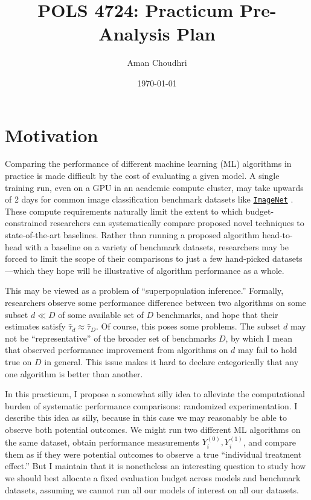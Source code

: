 \documentclass[11pt, oneside]{article}
\title{POLS 4724: Practicum Pre-Analysis Plan}
\author{Aman Choudhri}
\date{\today}
\newcommand{\dataset}[2]{
    \href{#2}{\texttt{#1}}
}
\newcommand{\ImageNet}{\dataset{ImageNet}{https://www.image-net.org/about.php}}
\begin{document}
\maketitle

\section*{Motivation}

Comparing the performance of different machine learning (ML) algorithms in practice
is made difficult by the cost of evaluating a given model. A single training
run, even on a GPU in an academic compute cluster, may take upwards of 2 days
for common image classification benchmark datasets like \ImageNet. These compute
requirements naturally limit the extent to which budget-constrained researchers
can systematically compare proposed novel techniques to state-of-the-art
baselines. Rather than running a proposed algorithm head-to-head with a
baseline on a variety of benchmark datasets, researchers may be forced to limit
the scope of their comparisons to just a few hand-picked datasets—which they
hope will be illustrative of algorithm performance as a whole.

This may be viewed as a problem of ``superpopulation inference.'' Formally,
researchers observe some performance difference between two algorithms on some
subset $d \ll D$ of some available set of $D$ benchmarks, and hope that their
estimates satisfy $\hat{\tau}_d \approx \hat{\tau}_D$. Of course, this poses some problems.
The subset $d$ may not be ``representative'' of the broader set of benchmarks $D$, by which
I mean that observed performance improvement from algorithms on $d$ may fail to hold
true on $D$ in general. This issue makes it hard to declare categorically that any
one algorithm is better than another.


In this practicum, I propose a somewhat silly idea to alleviate the
computational burden of systematic performance comparisons: randomized
experimentation. I describe this idea as silly, because in this case we may
reasonably be able to observe both potential outcomes. We might run two
different ML algorithms on the same dataset, obtain performance measurements
$Y_i^{(0)}, Y_i^{(1)}$, and compare them as if they were potential outcomes to
observe a true ``individual treatment effect.'' But I maintain that it is
nonetheless an interesting question to study how we should best allocate a
fixed evaluation budget across models and benchmark datasets, assuming we
cannot run all our models of interest on all our datasets. 
\end{document}
